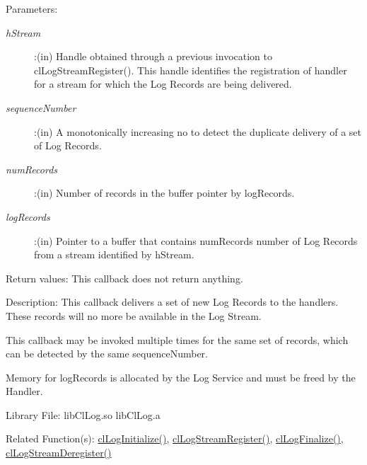 \begin{flushleft}
\begin{Desc}
\begin{verbatim}
\end{verbatim}
\normalsize
\end{Desc}
\begin{Desc}
\item[Parameters:] 
\begin{description}
\item[{\em hStream}]:(in) Handle obtained through a previous invocation to clLogStreamRegister(). This handle identifies the registration of handler 
for a stream for which the Log Records are being delivered.
\item[{\em sequenceNumber}]:(in) A monotonically increasing no to detect the duplicate delivery of a set of Log Records.
\item[{\em numRecords}]:(in) Number of records in the buffer pointer by logRecords.
\item[{\em *logRecords}]:(in) Pointer to a buffer that contains numRecords number of Log Records from a stream identified by hStream.
\end{description}
\end{Desc}
\begin{Desc}
\item[Return values:]
This callback does not return anything.
\end{Desc}
\begin{Desc}
\item[Description:] This callback delivers a set of new Log Records to the handlers. These records will no more be available in the Log Stream.
\par
This callback may be invoked multiple times for the same set of records, which can be detected by the same sequenceNumber.
\par
Memory for logRecords is allocated by the Log Service and must be freed by the Handler.
\end{Desc}
\begin{Desc}
\item[Library File:] libClLog.so
\newline
libClLog.a
\end{Desc}
\begin{Desc}
\item[Related Function(s):]\hyperlink{pagelog101}{clLogInitialize()}, \hyperlink{pagelog112}{clLogStreamRegister()},
\hyperlink{pagelog102}{clLogFinalize()}, \hyperlink{pagelog115}{clLogStreamDeregister()}
\end{Desc}
\newpage





\end{flushleft}
